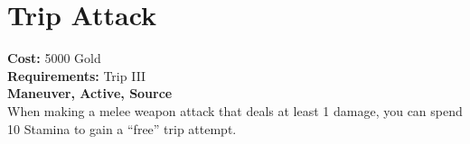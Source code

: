 \section*{Trip Attack}
\textbf{Cost:} 5000 Gold\\
\textbf{Requirements:} Trip III\\
\textbf{Maneuver, Active, Source}\\
When making a melee weapon attack that deals at least 1 damage, you can spend 10 Stamina to gain a “free” trip attempt.\\
